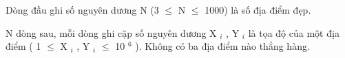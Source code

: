 Dòng đầu ghi số nguyên dương N (3  $\le$  N  $\le$  1000) là số địa điểm đẹp.  

   N dòng sau, mỗi dòng ghi cặp số nguyên dương X   $_    i   $   , Y   $_    i   $   là tọa độ của một địa điểm ( 1  $\le$  X   $_    i   $   , Y   $_    i   $    $\le$  10   $^    6   $   ). Không có ba địa điểm nào thẳng hàng.